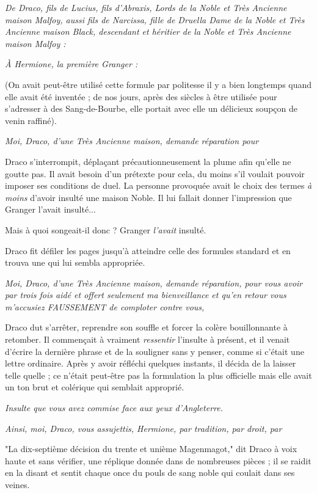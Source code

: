 \emph{De Draco, fils de Lucius, fils d'Abraxis, Lords de la Noble et Très Ancienne maison Malfoy, aussi fils de Narcissa, fille de Druella Dame de la Noble et Très Ancienne maison Black, descendant et héritier de la Noble et Très Ancienne maison Malfoy :} 

\emph{À Hermione, la première Granger :} 

(On avait peut-être utilisé cette formule par politesse il y a bien longtemps quand elle avait été inventée ; de nos jours, après des siècles à être utilisée pour s'adresser à des Sang-de-Bourbe, elle portait avec elle un délicieux soupçon de venin raffiné).

\emph{Moi, Draco, d'une Très Ancienne maison, demande réparation pour} 

Draco s'interrompit, déplaçant précautionneusement la plume afin qu'elle ne goutte pas. Il avait besoin d'un prétexte pour cela, du moins s'il voulait pouvoir imposer ses conditions de duel. La personne provoquée avait le choix des termes \emph{à moins}  d'avoir insulté une maison Noble. Il lui fallait donner l'impression que Granger l'avait insulté...

Mais à quoi songeait-il donc ? Granger \emph{l'avait}  insulté.

Draco fit défiler les pages jusqu'à atteindre celle des formules standard et en trouva une qui lui sembla appropriée.

\emph{Moi, Draco, d'une Très Ancienne maison, demande réparation, pour vous avoir par trois fois aidé et offert seulement ma bienveillance et qu'en retour vous m'accusiez \MakeUppercase{faussement} de comploter contre vous,} 

Draco dut s'arrêter, reprendre son souffle et forcer la colère bouillonnante à retomber. Il commençait à vraiment \emph{ressentir}  l'insulte à présent, et il venait d'écrire la dernière phrase et de la souligner sans y penser, comme si c'était une lettre ordinaire. Après y avoir réfléchi quelques instants, il décida de la laisser telle quelle ; ce n'était peut-être pas la formulation la plus officielle mais elle avait un ton brut et colérique qui semblait approprié.

\emph{Insulte que vous avez commise face aux yeux d'Angleterre.} 

\emph{Ainsi, moi, Draco, vous assujettis, Hermione, par tradition, par droit, par} 

"La dix-septième décision du trente et unième Magenmagot," dit Draco à voix haute et sans vérifier, une réplique donnée dans de nombreuses pièces ; il se raidit en la disant et sentit chaque once du pouls de sang noble qui coulait dans ses veines.

